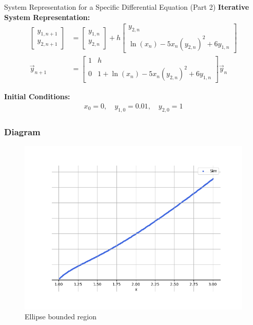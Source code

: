\documentclass{beamer}
\begin{document}
\begin{frame}{System Representation for a Specific Differential Equation (Part 2)}
\textbf{Iterative System Representation:}
\begin{align}
    \begin{bmatrix}
        y_{1, n+1} \\ 
        y_{2, n+1}
    \end{bmatrix}
    &=
    \begin{bmatrix}
        y_{1, n} \\ 
        y_{2, n}
    \end{bmatrix}
    +
    h
    \begin{bmatrix}
        y_{2, n} \\ 
        \ln(x_n) - 5x_n(y_{2,n})^2 + 6y_{1,n}
    \end{bmatrix} \\
    \vec{y}_{n+1} &= 
    \begin{bmatrix}
        1 & h \\ 
        0 & 1 + \ln(x_n) - 5x_n(y_{2,n})^2 + 6y_{1,n}
    \end{bmatrix}
    \vec{y}_n
\end{align}

\textbf{Initial Conditions:}
\begin{align}
    x_0 = 0, \quad y_{1, 0} = 0.01, \quad y_{2, 0} = 1
\end{align}
\end{frame}
\begin{frame}
\frametitle{Diagram}
\begin{figure}[!ht]
    \centering
    \includegraphics[width=\linewidth]{figs/Fig.png}
    \caption{Ellipse bounded region}
\end{figure}
\end{frame}
\end{document}
